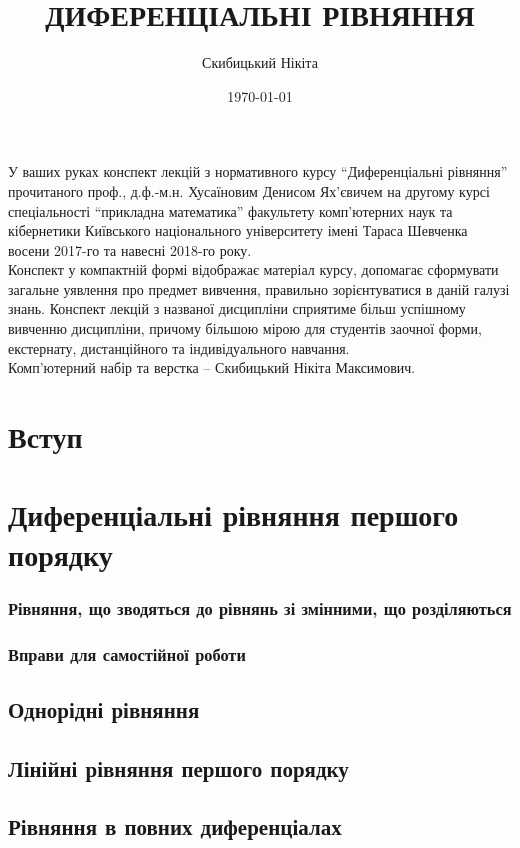 \documentclass[a4paper, 12pt]{article}
\title{{\Huge ДИФЕРЕНЦІАЛЬНІ РІВНЯННЯ}}
\author{Скибицький Нікіта}
\date{\today}
\theoremstyle{definition}
\numberwithin{equation}{section}%
\numberwithin{equation}{subsection}
\begin{document}
\maketitle \thispagestyle{empty} \newpage 

У ваших руках конспект лекцій з нормативного курсу ``Диференціальні рівняння'' прочитаного проф., д.ф.-м.н. Хусаїновим Денисом Ях'євичем на другому курсі спеціальності ``прикладна математика'' факультету ком\-п'ю\-тер\-них наук та кібернетики Київського національного університету імені Тараса Шевченка восени 2017-го та навесні 2018-го року. \\

Конспект у компактній формі відображає матеріал курсу, допомагає сформувати загальне уявлення про предмет вивчення, правильно зорієнтуватися в даній галузі знань. Конспект лекцій з названої дисципліни сприятиме більш успішному вивченню дисципліни, причому більшою мірою для студентів заочної форми, екстернату, дистанційного та індивідуального навчання. \\

Комп'ютерний набір та верстка -- Скибицький Нікіта Максимович. \newpage

\tableofcontents \newpage

\section*{Вступ}



\section{Диференціальні рівняння першого порядку}



\subsubsection{Рівняння, що зводяться до рівнянь зі змінними, що розділяються}



\subsubsection{Вправи для самостійної роботи}



\subsection{Однорідні рівняння}



\subsection{Лінійні рівняння першого порядку}



\subsection{Рівняння в повних диференціалах}


\end{document}
